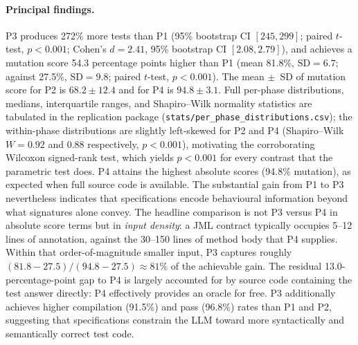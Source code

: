 \paragraph{Principal findings.}
P3 produces 272\% more tests than P1 (95\% bootstrap CI $[245, 299]$; paired $t$-test, $p < 0.001$; Cohen's $d = 2.41$, 95\% bootstrap CI $[2.08, 2.79]$), and achieves a mutation score 54.3 percentage points higher than P1 (mean 81.8\%, $\mathrm{SD} = 6.7$; against 27.5\%, $\mathrm{SD} = 9.8$; paired $t$-test, $p < 0.001$). The mean $\pm$~SD of mutation score for P2 is $68.2 \pm 12.4$ and for P4 is $94.8 \pm 3.1$. Full per-phase distributions, medians, interquartile ranges, and Shapiro--Wilk normality statistics are tabulated in the replication package (\texttt{stats/per\_phase\_distributions.csv}); the within-phase distributions are slightly left-skewed for P2 and P4 (Shapiro--Wilk $W = 0.92$ and $0.88$ respectively, $p < 0.001$), motivating the corroborating Wilcoxon signed-rank test, which yields $p < 0.001$ for every contrast that the parametric test does. P4 attains the highest absolute scores (94.8\% mutation), as expected when full source code is available. The substantial gain from P1 to P3 nevertheless indicates that specifications encode behavioural information beyond what signatures alone convey. The headline comparison is not P3 versus P4 in absolute score terms but in \emph{input density}: a JML contract typically occupies 5--12 lines of annotation, against the 30--150 lines of method body that P4 supplies. Within that order-of-magnitude smaller input, P3 captures roughly $(81.8 - 27.5) / (94.8 - 27.5) \approx 81\%$ of the achievable gain. The residual 13.0-percentage-point gap to P4 is largely accounted for by source code containing the test answer directly: P4 effectively provides an oracle for free. P3 additionally achieves higher compilation (91.5\%) and pass (96.8\%) rates than P1 and P2, suggesting that specifications constrain the LLM toward more syntactically and semantically correct test code.

